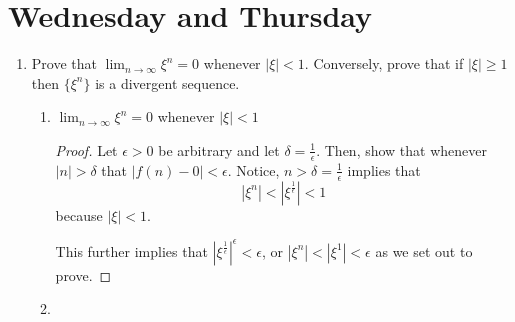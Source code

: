 \documentclass[11pt]{article}
\begin{document}
	\section{Wednesday and Thursday}
	\begin{enumerate}
		\item Prove that $\lim_{n \rightarrow \infty} \xi^n = 0$ whenever $|\xi| < 1$. Conversely, prove that if $|\xi| \geq 1$ then $\{\xi^n\}$ is a divergent sequence.
		
		\begin{enumerate}
			\item $\lim_{n \rightarrow \infty} \xi^n = 0$ whenever $|\xi| < 1$
			
			\begin{proof}
				Let $\epsilon > 0$ be arbitrary and let $\delta = \frac{1}{\epsilon}.$ Then, show that whenever $|n| > \delta$ that $|f(n) - 0| < \epsilon$. Notice,
				$n > \delta = \frac{1}{\epsilon}$ implies that
				\[|\xi^n| < |\xi^\frac{1}{\epsilon}| < 1\]
				because $|\xi| < 1$.
				
				\bigskip
				
				This further implies that $|\xi^\frac{1}{\epsilon}|^\epsilon < \epsilon$, or
				$|\xi^n| < |\xi^1| < \epsilon$ as we set out to prove.
			\end{proof}
			
			\item
			
		\end{enumerate}
	\end{enumerate}
	
\end{document}
